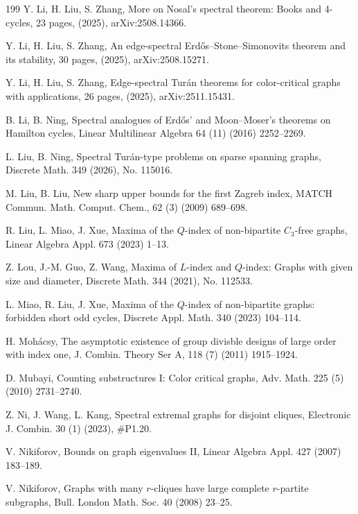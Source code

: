 \documentclass[11pt,a4paper]{article}
\theoremstyle{plain}
\theoremstyle{definition}
\begin{document}
\begin{thebibliography}{199}
Y. Li, H. Liu, S. Zhang, 
More on Nosal's spectral theorem: Books and 4-cycles, 
23 pages, (2025), arXiv:2508.14366. 


Y. Li, H. Liu, S. Zhang, 
An edge-spectral Erd\H{o}s--Stone--Simonovits theorem and its stability, 
30 pages, (2025), arXiv:2508.15271. 

Y. Li, H. Liu, S. Zhang, 
Edge-spectral Tur\'{a}n theorems for color-critical graphs with applications, 
26 pages, (2025), arXiv:2511.15431.  

B. Li, B. Ning, 
Spectral analogues of Erd\H{o}s' and Moon--Moser's theorems on Hamilton cycles, 
Linear Multilinear Algebra 64 (11) (2016) 2252--2269.

L. Liu, B. Ning, 
Spectral Tur\'{a}n-type problems on sparse spanning graphs, Discrete Math. 349 (2026), No. 115016.  

M. Liu, B. Liu, New sharp upper bounds for the first Zagreb index, MATCH Commun. Math. Comput. Chem., 62 (3) (2009) 689--698.

R. Liu, L. Miao, J. Xue, 
Maxima of the $Q$-index of non-bipartite $C_3$-free graphs, 
Linear Algebra Appl. 673 (2023) 1--13. 




Z. Lou, J.-M. Guo, Z. Wang, 
Maxima of $L$-index and $Q$-index: Graphs with given size and diameter, 
Discrete Math. 344 (2021), No. 112533.

L. Miao, R. Liu, J. Xue, 
Maxima of the $Q$-index of non-bipartite graphs: 
forbidden short odd cycles, 
Discrete Appl. Math. 340 (2023) 104--114.   

 H. Moh\'acsy, The asymptotic existence of group divisble designs of large order with index one,
 {J. Combin. Theory Ser A}, 118 (7) (2011) 1915--1924.

 D. Mubayi, 
 Counting substructures I: Color critical graphs, 
 Adv. Math. 225 (5) (2010) 2731--2740.

Z. Ni, J. Wang, L. Kang, 
Spectral extremal graphs for disjoint cliques, 
Electronic J. Combin.  30 (1) (2023), \#P1.20. 


V. Nikiforov, 
Bounds on graph eigenvalues II, 
Linear Algebra Appl. 427 (2007) 183--189.  

V. Nikiforov, 
Graphs with many $r$-cliques have large complete $r$-partite subgraphs, 
Bull. London Math. Soc. 40 (2008) 23--25. 


\end{thebibliography}
\end{document}
